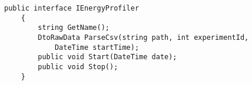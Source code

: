 \begin{lstlisting}[caption=The interface used to implement the entry profilers, label={lst:energy_profiler}]
    public interface IEnergyProfiler
    {
        string GetName();
        DtoRawData ParseCsv(string path, int experimentId, 
            DateTime startTime);
        public void Start(DateTime date);
        public void Stop();
    }
\end{lstlisting}